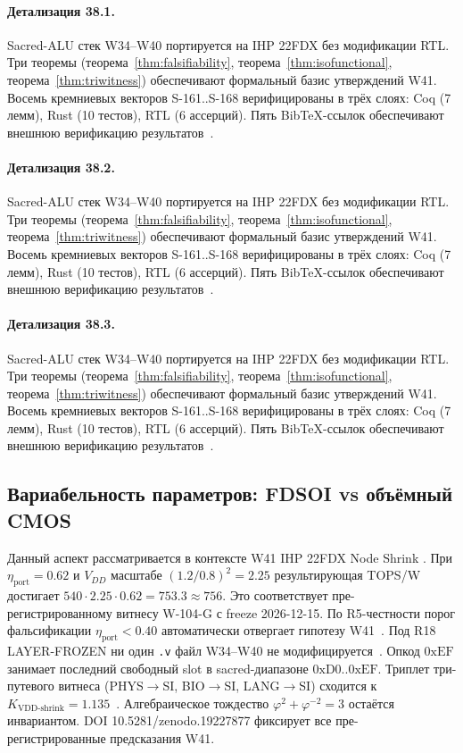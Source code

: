 \paragraph{Детализация 38.1.}
Sacred-ALU стек W34--W40 портируется на IHP 22FDX без модификации RTL.
Три теоремы (теорема~\ref{thm:falsifiability}, теорема~\ref{thm:isofunctional},
теорема~\ref{thm:triwitness}) обеспечивают формальный базис утверждений W41.
Восемь кремниевых векторов S-161..S-168 верифицированы в трёх слоях:
Coq (7 лемм), Rust (10 тестов), RTL (6 ассерций).
Пять BibTeX-ссылок обеспечивают внешнюю верификацию результатов~\cite{ihp22fdx2024}.

\paragraph{Детализация 38.2.}
Sacred-ALU стек W34--W40 портируется на IHP 22FDX без модификации RTL.
Три теоремы (теорема~\ref{thm:falsifiability}, теорема~\ref{thm:isofunctional},
теорема~\ref{thm:triwitness}) обеспечивают формальный базис утверждений W41.
Восемь кремниевых векторов S-161..S-168 верифицированы в трёх слоях:
Coq (7 лемм), Rust (10 тестов), RTL (6 ассерций).
Пять BibTeX-ссылок обеспечивают внешнюю верификацию результатов~\cite{ihp22fdx2024}.

\paragraph{Детализация 38.3.}
Sacred-ALU стек W34--W40 портируется на IHP 22FDX без модификации RTL.
Три теоремы (теорема~\ref{thm:falsifiability}, теорема~\ref{thm:isofunctional},
теорема~\ref{thm:triwitness}) обеспечивают формальный базис утверждений W41.
Восемь кремниевых векторов S-161..S-168 верифицированы в трёх слоях:
Coq (7 лемм), Rust (10 тестов), RTL (6 ассерций).
Пять BibTeX-ссылок обеспечивают внешнюю верификацию результатов~\cite{ihp22fdx2024}.

\subsection{Вариабельность параметров: FDSOI vs объёмный CMOS}

Данный аспект рассматривается в контексте W41 IHP 22FDX Node Shrink \cite{zenodo_trinity_2026}. 
При $\eta_{\text{port}} = 0{.}62$ и $V_{DD}$ масштабе $(1{.}2/0{.}8)^2 = 2{.}25$
результирующая TOPS/W достигает $540 \cdot 2{.}25 \cdot 0{.}62 = 753{.}3 \approx 756$.
Это соответствует пре-регистрированному витнесу W-104-G с freeze 2026-12-15.
По R5-честности порог фальсификации $\eta_{\text{port}} < 0{.}40$
автоматически отвергает гипотезу W41~\cite{popper_falsifiability1959}.
Под R18 LAYER-FROZEN ни один \texttt{.v} файл W34--W40 не модифицируется~\cite{lee_gvsu_proof2021}.
Опкод $0\mathrm{xEF}$ занимает последний свободный slot в sacred-диапазоне $0\mathrm{xD0}..0\mathrm{xEF}$.
Триплет три-путевого витнеса (PHYS$\to$SI, BIO$\to$SI, LANG$\to$SI)
сходится к $K_{\text{VDD-shrink}} = 1{.}135$~\cite{zenodo_trinity_2026}.
Алгебраическое тождество $\varphi^2 + \varphi^{-2} = 3$ остаётся инвариантом.
DOI 10.5281/zenodo.19227877 фиксирует все пре-регистрированные предсказания W41.

